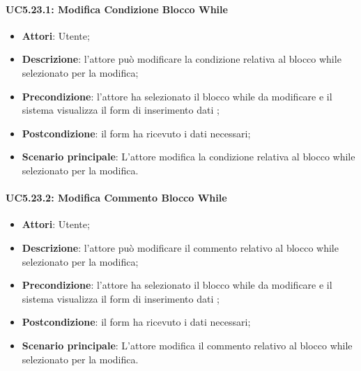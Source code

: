 \begin{itemize}
\begin{itemize}
\begin{itemize}
\begin{itemize}
\paragraph{UC5.23.1: Modifica Condizione Blocco While}
\label{UC5.23.1}
\begin{itemize}
	\item \textbf{Attori}: Utente;
	\item \textbf{Descrizione}: l'attore può modificare la condizione relativa al blocco while selezionato per la modifica;
	\item \textbf{Precondizione}: l'attore ha selezionato il blocco while da modificare e il sistema visualizza il form di inserimento dati ;
	\item \textbf{Postcondizione}: il form ha ricevuto i dati necessari;
	\item \textbf{Scenario principale}: L'attore modifica la condizione relativa al blocco while selezionato per la modifica.
\end{itemize}

\paragraph{UC5.23.2: Modifica Commento Blocco While}
\label{UC5.23.2}
\begin{itemize}
	\item \textbf{Attori}: Utente;
	\item \textbf{Descrizione}: l'attore può modificare il commento relativo al blocco while selezionato per la modifica;
	\item \textbf{Precondizione}: l'attore ha selezionato il blocco while da modificare e il sistema visualizza il form di inserimento dati ;
	\item \textbf{Postcondizione}: il form ha ricevuto i dati necessari;
	\item \textbf{Scenario principale}: L'attore modifica il commento relativo al blocco while selezionato per la modifica.
\end{itemize}


\end{itemize}
\end{itemize}
\end{itemize}
\end{itemize}
